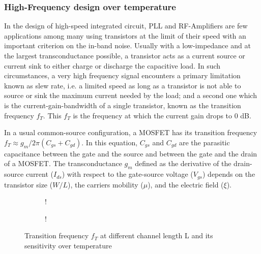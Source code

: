 \subsubsection{High-Frequency design over temperature}
\label{sec:des_speed}
In the design of high-speed integrated circuit, PLL and RF-Amplifiers are few applications among many using transistors at the limit of their speed with an important criterion on the in-band noise. Usually with a low-impedance and at the largest transconductance possible, a transistor acts as a current source or current sink to either charge or discharge the capacitive load. In such circumstances, a very high frequency signal encounters a primary limitation known as slew rate, i.e. a limited speed as long as a transistor is not able to source or sink the maximum current needed by the load; and a second one which is the current-gain-bandwidth of a single transistor, known as the transition frequency \(f_T \).  This \(f_T \) is the frequency at which the current gain drops to 0 dB.

In a usual common-source configuration, a MOSFET has its transition frequency \(f_T \approx g_m/2\pi (C_{gs}+C_{gd})\). In this equation, \(C_{gs} \) and  \(C_{gd} \) are the parasitic capacitance between the gate and the source and between the gate and the drain of a MOSFET. The transconductance \(g_m \) defined as the derivative of the drain-source current (\(I_{ds} \)) with respect to the gate-source voltage (\(V_{gs}\)) depends on the transistor size (\(W/L\)), the carriers mobility (\(\mu \)), and the electric field (\(\xi \)).

\begin{figure}[!ht]
	\centering
	\begin{subfigure}[b]{0.48\textwidth}
		\resizebox {\textwidth} {!} { 
			
		}
	\end{subfigure}
	\begin{subfigure}[b]{0.48\textwidth}
		\resizebox {\textwidth} {!} { 
			
		}
		\label{fig:ft_nel_sensitivity}
	\end{subfigure}
	\caption{Transition frequency \(f_T\) at different channel length L and its sensitivity over temperature}
	\label{fig:ft_nel}
\end{figure}

